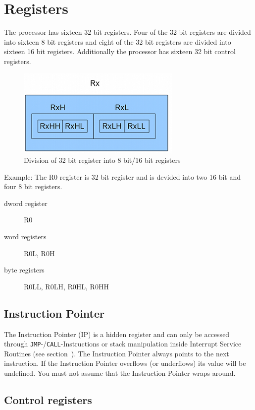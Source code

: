 \section{Registers}

The processor has sixteen 32 bit registers. Four of the 32 bit registers are divided into sixteen 8 bit registers and eight of the
32 bit registers are divided into sixteen 16 bit registers. Additionally the processor has sixteen 32 bit control registers.

\begin{figure}[H]
\begin{center}
	\includegraphics{./files/regdiv.png}
\end{center}
	\caption{Division of 32 bit register into 8 bit/16 bit registers}
\end{figure}

Example:
The R0 register is 32 bit register and is devided into two 16 bit and four 8 bit registers.
\begin{description}
\item[dword register] R0
\item[word registers] R0L, R0H
\item[byte registers] R0LL, R0LH, R0HL, R0HH
\end{description}

\subsection{Instruction Pointer}

The Instruction Pointer (IP) is a hidden register and can only be accessed through \verb|JMP|-/\verb|CALL|-Instructions or stack manipulation
inside Interrupt Service Routines (see section~). The
Instruction Pointer always points to the next instruction. If the Instruction Pointer overflows (or underflows) its value will be undefined.
You must not assume that the Instruction Pointer wraps around. 

\subsection{Control registers}

